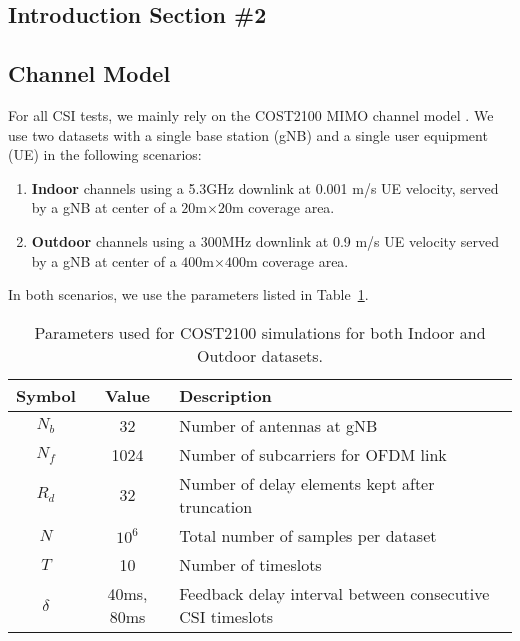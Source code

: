 \subsection{Introduction Section \#2}
\label{sect:intro_2}

\blindtext 

\subsection{Channel Model}
\label{sect:channel_model}

For all CSI tests, we mainly rely on the COST2100 MIMO channel model \cite{ref:liu2012cost2100}. We use two datasets with a single base station (gNB) and a single user equipment (UE) in the following scenarios:
\begin{enumerate}
	\item \textbf{Indoor} channels using a 5.3GHz downlink at
	0.001 m/s UE velocity, served by a
	gNB at center of a $20$m$\times 20$m coverage area.
	\item \textbf{Outdoor} channels using a 300MHz downlink at 0.9 m/s UE velocity served by a gNB at center 
	of a $400$m$\times 400$m coverage area.
\end{enumerate}
In both scenarios, we use the parameters listed in Table~\ref{tab:cost-params}.
\begin{table}[]
\centering
\caption{Parameters used for COST2100 simulations for both Indoor and Outdoor datasets.}
\label{tab:cost-params}
\begin{tabular}{c|c|l}
\toprule
\textbf{Symbol} & \textbf{Value} & \textbf{Description} \\ \midrule
$N_b$ 			& 32			 & Number of antennas at gNB  \\ \hline
$N_f$ 			& 1024			 & Number of subcarriers for OFDM link  \\ \hline
$R_d$ 			& 32			 & Number of delay elements kept after truncation  \\ \hline
$N$ 			& $10^6$		 & Total number of samples per dataset  \\ \hline
$T$ 			& 10		 	 & Number of timeslots  \\ \hline
$\delta$		& 40ms, 80ms	 & Feedback delay interval between consecutive CSI timeslots  \\ \bottomrule
\end{tabular}
\end{table}
